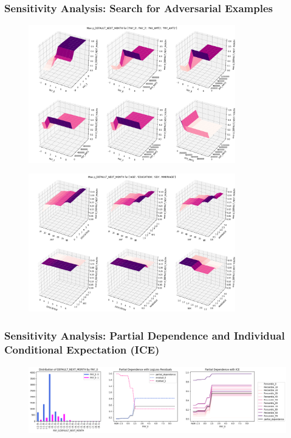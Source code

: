 \documentclass[11pt,
               aspectratio=43,
               hyperref={colorlinks}
               ]{beamer}
\begin{document}
			\begin{frame}[allowframebreaks]
		
				\frametitle{\textbf{Sensitivity Analysis}: Search for Adversarial Examples}
		
				\begin{figure}[htb]
					\begin{center}
						\includegraphics[height=170pt]{img/sa_max_prob.png}
					\end{center}
				\end{figure}	
				
				\framebreak
		
				\begin{figure}[htb]
					\begin{center}
						\includegraphics[height=170pt]{img/sa_max_prob_demo.png}
					\end{center}
				\end{figure}		
		
			\end{frame}
			
			\begin{frame}
		
				\frametitle{\textbf{Sensitivity Analysis}: Partial Dependence and Individual Conditional Expectation (ICE)}
		
				\begin{figure}[htb]
					\begin{center}
						\includegraphics[height=83pt]{img/pd.png}
					\end{center}
				\end{figure}	
		
			\end{frame}			
			
\end{document}
